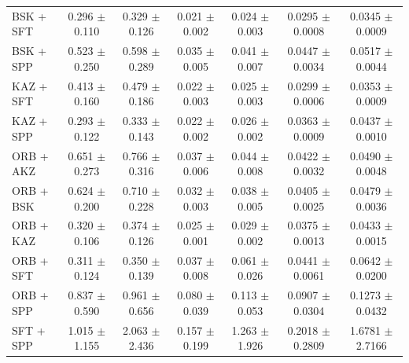 \begin{table}[hbp]
\begin{tabular}{lcccccc}
BSK + SFT & 0.296 $\pm$ 0.110 & 0.329 $\pm$ 0.126 & 0.021 $\pm$ 0.002 & 0.024 $\pm$ 0.003 & 0.0295 $\pm$ 0.0008 & 0.0345 $\pm$ 0.0009 \\
BSK + SPP & 0.523 $\pm$ 0.250 & 0.598 $\pm$ 0.289 & 0.035 $\pm$ 0.005 & 0.041 $\pm$ 0.007 & 0.0447 $\pm$ 0.0034 & 0.0517 $\pm$ 0.0044 \\
KAZ + SFT & 0.413 $\pm$ 0.160 & 0.479 $\pm$ 0.186 & 0.022 $\pm$ 0.003 & 0.025 $\pm$ 0.003 & 0.0299 $\pm$ 0.0006 & 0.0353 $\pm$ 0.0009 \\
KAZ + SPP & 0.293 $\pm$ 0.122 & 0.333 $\pm$ 0.143 & 0.022 $\pm$ 0.002 & 0.026 $\pm$ 0.002 & 0.0363 $\pm$ 0.0009 & 0.0437 $\pm$ 0.0010 \\
ORB + AKZ & 0.651 $\pm$ 0.273 & 0.766 $\pm$ 0.316 & 0.037 $\pm$ 0.006 & 0.044 $\pm$ 0.008 & 0.0422 $\pm$ 0.0032 & 0.0490 $\pm$ 0.0048 \\
ORB + BSK & 0.624 $\pm$ 0.200 & 0.710 $\pm$ 0.228 & 0.032 $\pm$ 0.003 & 0.038 $\pm$ 0.005 & 0.0405 $\pm$ 0.0025 & 0.0479 $\pm$ 0.0036 \\
ORB + KAZ & 0.320 $\pm$ 0.106 & 0.374 $\pm$ 0.126 & 0.025 $\pm$ 0.001 & 0.029 $\pm$ 0.002 & 0.0375 $\pm$ 0.0013 & 0.0433 $\pm$ 0.0015 \\
ORB + SFT & 0.311 $\pm$ 0.124 & 0.350 $\pm$ 0.139 & 0.037 $\pm$ 0.008 & 0.061 $\pm$ 0.026 & 0.0441 $\pm$ 0.0061 & 0.0642 $\pm$ 0.0200 \\
ORB + SPP & 0.837 $\pm$ 0.590 & 0.961 $\pm$ 0.656 & 0.080 $\pm$ 0.039 & 0.113 $\pm$ 0.053 & 0.0907 $\pm$ 0.0304 & 0.1273 $\pm$ 0.0432 \\
SFT + SPP & 1.015 $\pm$ 1.155 & 2.063 $\pm$ 2.436 & 0.157 $\pm$ 0.199 & 1.263 $\pm$ 1.926 & 0.2018 $\pm$ 0.2809 & 1.6781 $\pm$ 2.7166 \\
\bottomrule
\end{tabular}
\end{table}
